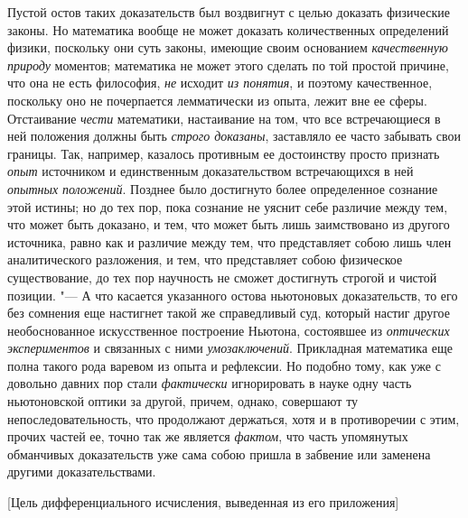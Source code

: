 Пустой остов таких доказательств был воздвигнут с целью доказать физические
законы. Но математика вообще не может доказать количественных определений
физики, поскольку они суть законы, имеющие своим основанием {\em качественную
природу} моментов; математика не может этого сделать по той простой причине,
что она не есть философия, {\em не} исходит {\em из понятия}, и поэтому
качественное, поскольку оно не почерпается лемматически из опыта, лежит вне ее
сферы. Отстаивание {\em чести} математики, настаивание на том, что все
встречающиеся в ней положения должны быть {\em строго доказаны}, заставляло ее
часто забывать свои границы. Так, например, казалось противным ее достоинству
просто признать {\em опыт} источником и единственным доказательством
встречающихся в ней {\em опытных }{\em положений}. Позднее было достигнуто
более определенное сознание этой истины; но до тех пор, пока сознание не уяснит
себе различие между тем, что может быть доказано, и тем, что может быть лишь
заимствовано из другого источника, равно как и различие между тем, что
представляет собою лишь член аналитического разложения, и тем, что представляет
собою физическое существование, до тех пор научность не сможет достигнуть
строгой и чистой позиции. "--- А что касается указанного остова ньютоновых
доказательств, то его без сомнения еще настигнет такой же справедливый суд,
который настиг другое необоснованное искусственное построение Ньютона,
состоявшее из {\em оптических экспериментов} и связанных с ними
{\em умозаключений}. Прикладная математика еще полна такого рода варевом из
опыта и рефлексии. Но подобно тому, как уже с довольно давних пор стали
{\em фактически} игнорировать в науке одну часть ньютоновской оптики за другой,
причем, однако, совершают ту непоследовательность, что продолжают держаться,
хотя и в противоречии с этим, прочих частей ее, точно так же является
{\em фактом}, что часть упомянутых обманчивых доказательств уже сама собою
пришла в забвение или заменена другими доказательствами.

%
{[Цель дифференциального исчисления, выведенная из его приложения]}

